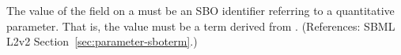 The value of the  field on a \Parameter must be an SBO
identifier referring to a quantitative parameter.  That is, the value must
be a term derived from \sboparameter.  (References: SBML L2v2
Section~\ref{sec:parameter-sboterm}.)
